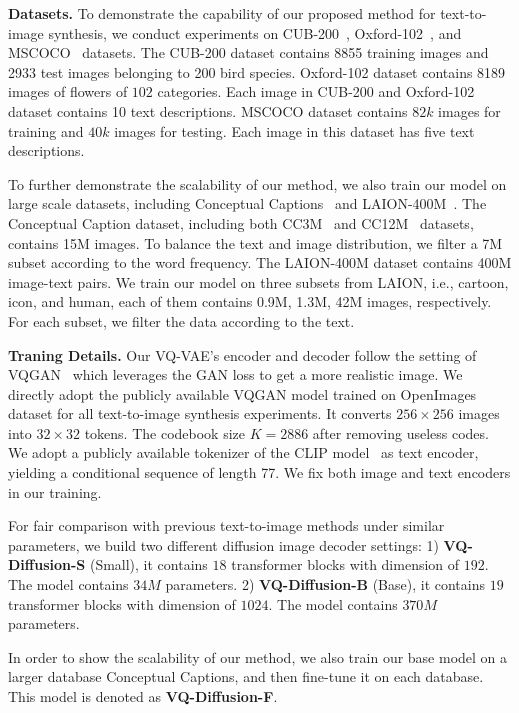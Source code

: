 \textbf{Datasets.} To demonstrate the capability of our proposed method for text-to-image synthesis, we conduct experiments on CUB-200~\cite{wah2011caltech}, Oxford-102~\cite{nilsback2008automated}, and MSCOCO~\cite{lin2014microsoft} datasets. The CUB-200 dataset contains 8855 training images and 2933 test images belonging to 200 bird species. Oxford-102 dataset contains 8189 images of flowers of $102$ categories. Each image in CUB-200 and Oxford-102 dataset contains 10 text descriptions. MSCOCO dataset contains $82k$ images for training and $40k$ images for testing. Each image in this dataset has five text descriptions.  

To further demonstrate the scalability of our method, we also train our model on large scale datasets, including Conceptual Captions~\cite{sharma2018conceptual,changpinyo2021conceptual} and LAION-400M~\cite{schuhmann2021laion}. The Conceptual Caption dataset, including both CC3M~\cite{sharma2018conceptual} and CC12M~\cite{changpinyo2021conceptual} datasets, contains 15M images. To balance the text and image distribution, we filter a 7M subset according to the word frequency. The LAION-400M dataset contains 400M image-text pairs. We train our model on three subsets from LAION, i.e., cartoon, icon, and human, each of them contains 0.9M, 1.3M, 42M images, respectively. For each subset, we filter the data according to the text. 

\textbf{Traning Details.} Our VQ-VAE's encoder and decoder follow the setting of VQGAN~\cite{esser2021taming} which leverages the GAN loss to get a more realistic image. We directly adopt the publicly available VQGAN model trained on OpenImages~\cite{krasin2017openimages} dataset for all text-to-image synthesis experiments. It converts $256\times 256$ images into $32 \times 32$ tokens. The codebook size $K = 2886$ after removing useless codes. We adopt a publicly available tokenizer of the CLIP model~\cite{radford2021learning} as text encoder, yielding a conditional sequence of length 77. We fix both image and text encoders in our training. 

For fair comparison with previous text-to-image methods under similar parameters, we build two different diffusion image decoder settings: 1) \textbf{VQ-Diffusion-S} (Small), it contains $18$ transformer blocks with dimension of $192$. The model contains $34M$ parameters. 2) \textbf{VQ-Diffusion-B} (Base), it contains $19$ transformer blocks with dimension of $1024$. The model contains $370M$ parameters. 

In order to show the scalability of our method, we also train our base model on a larger database Conceptual Captions, and then fine-tune it on each database. This model is denoted as \textbf{VQ-Diffusion-F}.

